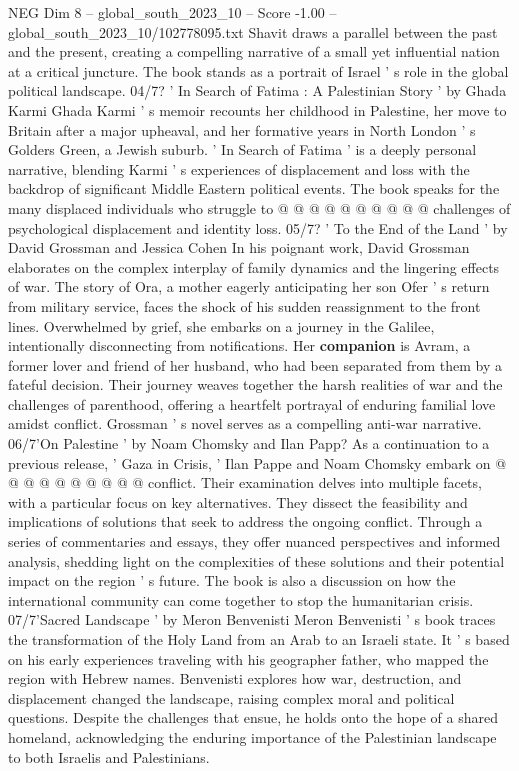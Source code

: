 \begin{textsample}{NEG Dim 8 – global\_south\_2023\_10 – Score -1.00 – global\_south\_2023\_10/102778095.txt}
Shavit draws a parallel between the past and the present, creating a compelling narrative of a small yet influential nation at a critical juncture.
The book stands as a portrait of Israel ' s role in the global political landscape. 04/7? ' In Search of Fatima : A Palestinian Story ' by Ghada Karmi Ghada Karmi ' s memoir recounts her childhood in Palestine, her move to Britain after a major upheaval, and her formative years in North London ' s Golders Green, a Jewish suburb. ' In Search of Fatima ' is a deeply personal narrative, blending Karmi ' s experiences of displacement and loss with the backdrop of significant Middle Eastern political events.
The book speaks for the many displaced individuals who struggle to @ @ @ @ @ @ @ @ @ @ challenges of psychological displacement and identity loss. 05/7? ' To the End of the Land ' by David Grossman and Jessica Cohen In his poignant work, David Grossman elaborates on the complex interplay of family dynamics and the lingering effects of war.
The story of Ora, a mother eagerly anticipating her son Ofer ' s return from military service, faces the shock of his sudden reassignment to the front lines.
Overwhelmed by grief, she embarks on a journey in the Galilee, intentionally disconnecting from notifications.
Her \textbf{companion} is Avram, a former lover and friend of her husband, who had been separated from them by a fateful decision.
Their journey weaves together the harsh realities of war and the challenges of parenthood, offering a heartfelt portrayal of enduring familial love amidst conflict.
Grossman ' s novel serves as a compelling anti-war narrative. 06/7'On Palestine ' by Noam Chomsky and Ilan Papp?
As a continuation to a previous release, ' Gaza in Crisis, ' Ilan Pappe and Noam Chomsky embark on @ @ @ @ @ @ @ @ @ @ conflict.
Their examination delves into multiple facets, with a particular focus on key alternatives.
They dissect the feasibility and implications of solutions that seek to address the ongoing conflict.
Through a series of commentaries and essays, they offer nuanced perspectives and informed analysis, shedding light on the complexities of these solutions and their potential impact on the region ' s future.
The book is also a discussion on how the international community can come together to stop the humanitarian crisis. 07/7'Sacred Landscape ' by Meron Benvenisti Meron Benvenisti ' s book traces the transformation of the Holy Land from an Arab to an Israeli state.
It ' s based on his early experiences traveling with his geographer father, who mapped the region with Hebrew names.
Benvenisti explores how war, destruction, and displacement changed the landscape, raising complex moral and political questions.
Despite the challenges that ensue, he holds onto the hope of a shared homeland, acknowledging the enduring importance of the Palestinian landscape to both Israelis and Palestinians.

\end{textsample}

